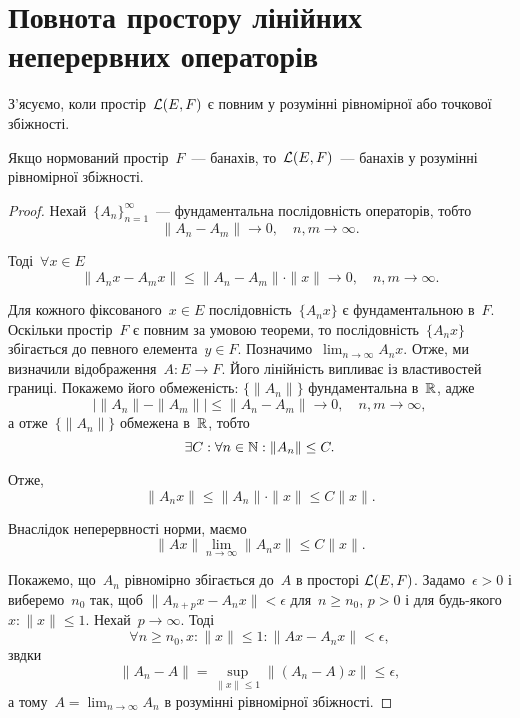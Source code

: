 \section{Повнота простору лінійних неперервних операторів}

З’ясуємо, коли простір~$\mathcal{L}(E, F)$ є повним у розумінні
рівномірної або точкової збіжності.

\begin{theorem}
Якщо нормований простір~$F$~--- банахів,
то~$\mathcal{L}(E, F)$~--- банахів у розумінні рівномірної збіжності.
\end{theorem}

\begin{proof}
Нехай~$\{A_n\}_{n = 1}^\infty$~--- фундаментальна
послідовність операторів, тобто
\begin{equation*}
    \|A_n - A_m\| \to 0, \quad n, m \to \infty.
\end{equation*}

Тоді~$\forall x \in E$
\begin{equation*}
    \|A_n x - A_m x\| \le \|A_n - A_m\| \cdot \|x\| \to 0, \quad n, m \to \infty.
\end{equation*}

Для кожного фіксованого~$x \in E$ послідовність~$\{A_n x\}$ є
фундаментальною в~$F$. Оскільки простір~$F$ є повним за
умовою теореми, то послідовність~$\{A_n x\}$ збігається до
певного елемента~$y \in F$. Позначимо~$\lim_{n \to \infty} A_n x$.
Отже, ми визначили відображення~$A: E \to F$.
Його лінійність випливає із властивостей границі.
Покажемо його обмеженість:
$\{\|A_n\|\}$ фундаментальна в~$\mathbb{R}$, адже
\begin{equation*}
    |\|A_n\| - \|A_m\|| \le \|A_n - A_m\| \to 0, \quad n, m \to \infty,
\end{equation*}
а отже~$\{\|A_n\|\}$ обмежена в~$\mathbb{R}$, тобто
\begin{equation*}
    \exists C: \forall n \in \mathbb{N}: \|A_n\| \le C.
\end{equation*}

Отже,
\begin{equation*}
    \|A_n x\| \le \|A_n\| \cdot \|x\| \le C \|x\|.
\end{equation*}

Внаслідок неперервності норми, маємо
\begin{equation*}
    \|A x\| \lim_{n \to \infty} \|A_n x\| \le C \|x\|.
\end{equation*}

Покажемо, що~$A_n$ рівномірно збігається до~$A$ в просторі
$\mathcal{L}(E, F)$. Задамо~$\epsilon > 0$ і виберемо~$n_0$ так, щоб
$\|A_{n + p} x - A_n x\| < \epsilon$ для~$n \ge n_0$, $p > 0$ і для будь-якого
$x: \|x\| \le 1$.
Нехай~$p \to \infty$. Тоді
\begin{equation*}
    \forall n \ge n_0, x: \|x\| \le 1:
    \|A x - A_n x\| < \epsilon,
\end{equation*}
звдки
\begin{equation*}
    \|A_n - A\| = \sup_{\|x\| \le 1} \|(A_n - A) x\| \le \epsilon,
\end{equation*}
а тому~$A = \lim_{n \to \infty} A_n$
в розумінні рівномірної збіжності.


\end{proof}
